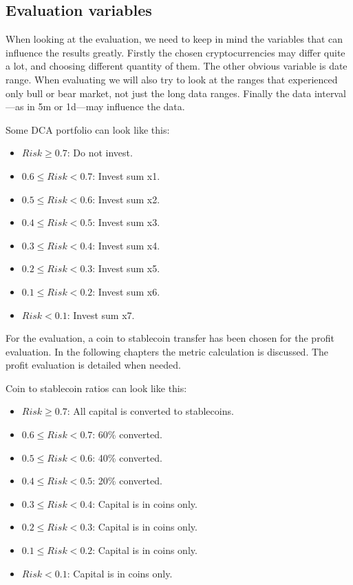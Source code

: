 \subsection*{Evaluation variables}
When looking at the evaluation, we need to keep in mind the variables that can influence the results greatly. Firstly the chosen cryptocurrencies may differ quite a lot, and choosing different quantity of them. The other obvious variable is date range. When evaluating we will also try to look at the ranges that experienced only bull or bear market, not just the long data ranges. Finally the data interval---as in 5m or 1d---may influence the data.

Some DCA portfolio can look like this:
\begin{itemize}
    \item $Risk \ge  0.7$: Do not invest.
    \item $0.6 \le Risk < 0.7$: Invest sum x1.
    \item $0.5 \le Risk < 0.6$: Invest sum x2.
    \item $0.4 \le Risk < 0.5$: Invest sum x3.
    \item $0.3 \le Risk < 0.4$: Invest sum x4.
    \item $0.2 \le Risk < 0.3$: Invest sum x5.
    \item $0.1 \le Risk < 0.2$: Invest sum x6.
    \item $Risk < 0.1$: Invest sum x7.
\end{itemize}

For the evaluation, a coin to stablecoin transfer has been chosen for the profit evaluation. In the following chapters the metric calculation is discussed. The profit evaluation is detailed when needed.

Coin to stablecoin ratios can look like this:
\begin{itemize}
    \item $Risk \ge  0.7$: All capital is converted to stablecoins.
    \item $0.6 \le Risk < 0.7$: 60\% converted.
    \item $0.5 \le Risk < 0.6$: 40\% converted.
    \item $0.4 \le Risk < 0.5$: 20\% converted.
    \item $0.3 \le Risk < 0.4$: Capital is in coins only.
    \item $0.2 \le Risk < 0.3$: Capital is in coins only.
    \item $0.1 \le Risk < 0.2$: Capital is in coins only.
    \item $Risk < 0.1$: Capital is in coins only.
\end{itemize}


